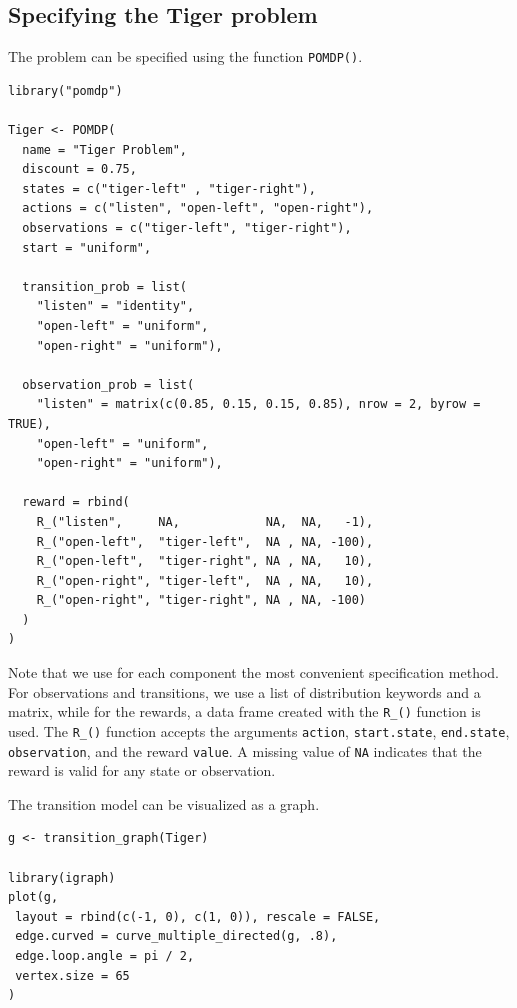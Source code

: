 \hypertarget{specifying-the-tiger-problem}{%
\subsection{Specifying the Tiger problem}\label{specifying-the-tiger-problem}}

The problem can be specified using the function \texttt{POMDP()}.

\begin{verbatim}
library("pomdp")

Tiger <- POMDP(
  name = "Tiger Problem",
  discount = 0.75,
  states = c("tiger-left" , "tiger-right"),
  actions = c("listen", "open-left", "open-right"),
  observations = c("tiger-left", "tiger-right"),
  start = "uniform",
  
  transition_prob = list(
    "listen" = "identity", 
    "open-left" = "uniform", 
    "open-right" = "uniform"),

  observation_prob = list(
    "listen" = matrix(c(0.85, 0.15, 0.15, 0.85), nrow = 2, byrow = TRUE), 
    "open-left" = "uniform",
    "open-right" = "uniform"),
    
  reward = rbind(
    R_("listen",     NA,            NA,  NA,   -1),
    R_("open-left",  "tiger-left",  NA , NA, -100),
    R_("open-left",  "tiger-right", NA , NA,   10),
    R_("open-right", "tiger-left",  NA , NA,   10),
    R_("open-right", "tiger-right", NA , NA, -100)
  )
)
\end{verbatim}

Note that we use for each component the most convenient specification method. For observations and transitions, we use a
list of distribution keywords and a matrix, while for the rewards, a data frame created with the \texttt{R\_()} function is used.
The \texttt{R\_()} function accepts the arguments \texttt{action},
\texttt{start.state}, \texttt{end.state},
\texttt{observation}, and the reward \texttt{value}.
A missing value of \texttt{NA} indicates that the reward is valid for any
state or observation.

The transition model can be visualized as a graph.

\begin{verbatim}
g <- transition_graph(Tiger)

library(igraph)
plot(g,
 layout = rbind(c(-1, 0), c(1, 0)), rescale = FALSE,
 edge.curved = curve_multiple_directed(g, .8),
 edge.loop.angle = pi / 2,
 vertex.size = 65
)
\end{verbatim}

